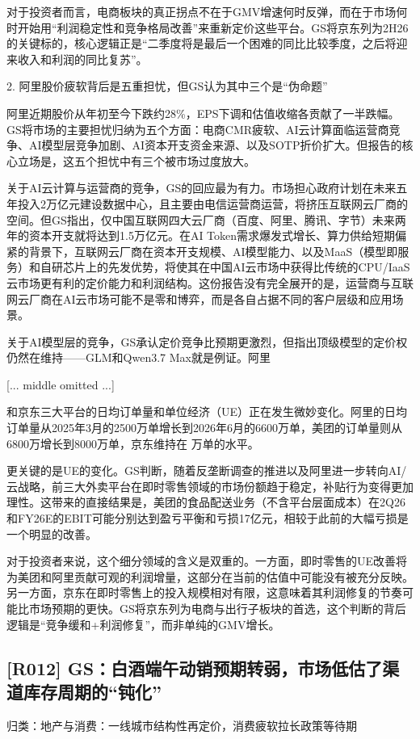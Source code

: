 \documentclass[11pt]{ctexart}
\begin{document}
对于投资者而言，电商板块的真正拐点不在于GMV增速何时反弹，而在于市场何时开始用“利润稳定性和竞争格局改善”来重新定价这些平台。GS将京东列为2H26的关键标的，核心逻辑正是“二季度将是最后一个困难的同比比较季度，之后将迎来收入和利润的同比复苏”。

2. 阿里股价疲软背后是五重担忧，但GS认为其中三个是“伪命题”

阿里近期股价从年初至今下跌约28\%，EPS下调和估值收缩各贡献了一半跌幅。GS将市场的主要担忧归纳为五个方面：电商CMR疲软、AI云计算面临运营商竞争、AI模型层竞争加剧、AI资本开支资金来源、以及SOTP折价扩大。但报告的核心立场是，这五个担忧中有三个被市场过度放大。

关于AI云计算与运营商的竞争，GS的回应最为有力。市场担心政府计划在未来五年投入2万亿元建设数据中心，且主要由电信运营商运营，将挤压互联网云厂商的空间。但GS指出，仅中国互联网四大云厂商（百度、阿里、腾讯、字节）未来两年的资本开支就将达到1.5万亿元。在AI Token需求爆发式增长、算力供给短期偏紧的背景下，互联网云厂商在资本开支规模、AI模型能力、以及MaaS（模型即服务）和自研芯片上的先发优势，将使其在中国AI云市场中获得比传统的CPU/IaaS云市场更有利的定价能力和利润结构。这份报告没有完全展开的是，运营商与互联网云厂商在AI云市场可能不是零和博弈，而是各自占据不同的客户层级和应用场景。

关于AI模型层的竞争，GS承认定价竞争比预期更激烈，但指出顶级模型的定价权仍然在维持——GLM和Qwen3.7 Max就是例证。阿里

[... middle omitted ...]

和京东三大平台的日均订单量和单位经济（UE）正在发生微妙变化。阿里的日均订单量从2025年3月的2500万单增长到2026年6月的6600万单，美团的订单量则从6800万增长到8000万单，京东维持在 万单的水平。

更关键的是UE的变化。GS判断，随着反垄断调查的推进以及阿里进一步转向AI/云战略，前三大外卖平台在即时零售领域的市场份额趋于稳定，补贴行为变得更加理性。这带来的直接结果是，美团的食品配送业务（不含平台层面成本）在2Q26和FY26E的EBIT可能分别达到盈亏平衡和亏损17亿元，相较于此前的大幅亏损是一个明显的改善。

对于投资者来说，这个细分领域的含义是双重的。一方面，即时零售的UE改善将为美团和阿里贡献可观的利润增量，这部分在当前的估值中可能没有被充分反映。另一方面，京东在即时零售上的投入规模相对有限，这意味着其利润修复的节奏可能比市场预期的更快。GS将京东列为电商与出行子板块的首选，这个判断的背后逻辑是“竞争缓和+利润修复”，而非单纯的GMV增长。

\subsection{[R012] GS：白酒端午动销预期转弱，市场低估了渠道库存周期的“钝化”}
{\small\color{refgray}归类：地产与消费：一线城市结构性再定价，消费疲软拉长政策等待期}
\end{document}
